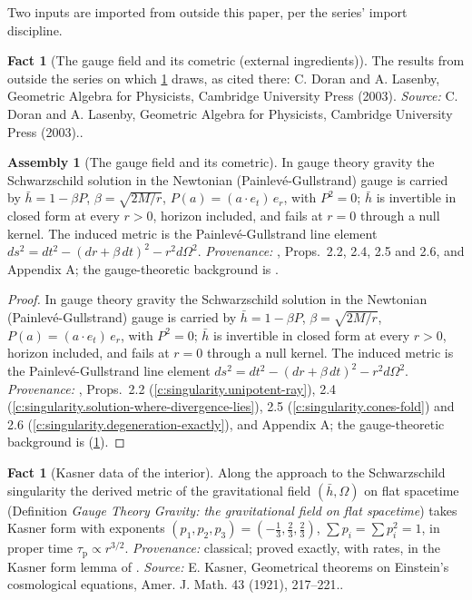 \documentclass[11pt]{article}
\theoremstyle{definition}
\newtheorem{fact}[theorem]{Fact}
\newtheorem{assembled}[theorem]{Assembly}
\theoremstyle{plain}
\newcommand{\changedmark}[2]{\marginpar{\raggedright\scriptsize\color{#1}#2}}
\providecommand{\hb}{}\renewcommand{\hb}{\bar{h}}
\begin{document}
Two inputs are imported from outside this paper, per the series' import discipline.

\begin{fact}[The gauge field and its cometric (external ingredients)]\label{c:sheaf.gauge-field-cometric-external}
The results from outside the series on which \ref{c:sheaf.gauge-field-cometric} draws, as cited there: C. Doran and A. Lasenby, Geometric Algebra for Physicists, Cambridge University Press (2003).
\emph{Source:} C. Doran and A. Lasenby, Geometric Algebra for Physicists, Cambridge University Press (2003)..
\end{fact}

\begin{assembled}[The gauge field and its cometric]\label{c:sheaf.gauge-field-cometric}
In gauge theory gravity the Schwarzschild solution in the Newtonian (Painlev\'e-Gullstrand) gauge is carried by $\hb = 1 - \beta P$, $\beta = \sqrt{2M/r}$, $P(a) = (a \cdot e_t)\,e_r$, with $P^2 = 0$; $\hb$ is invertible in closed form at every $r > 0$, horizon included, and fails at $r = 0$ through a null kernel. The induced metric is the Painlev\'e-Gullstrand line element $ds^2 = dt^2 - (dr + \beta\,dt)^2 - r^2 d\Omega^2$. \emph{Provenance:} \cite{ButlerT5}, Props.~2.2, 2.4, 2.5 and 2.6, and Appendix A; the gauge-theoretic background is \cite{DoranLasenby2003}.
\end{assembled}
\begin{proof}
In gauge theory gravity the Schwarzschild solution in the Newtonian (Painlev\'e-Gullstrand) gauge is carried by $\hb = 1 - \beta P$, $\beta = \sqrt{2M/r}$, $P(a) = (a \cdot e_t)\,e_r$, with $P^2 = 0$; $\hb$ is invertible in closed form at every $r > 0$, horizon included, and fails at $r = 0$ through a null kernel. The induced metric is the Painlev\'e-Gullstrand line element $ds^2 = dt^2 - (dr + \beta\,dt)^2 - r^2 d\Omega^2$. \emph{Provenance:} \cite{ButlerT5}, Props.~2.2 (\ref{c:singularity.unipotent-ray}), 2.4 (\ref{c:singularity.solution-where-divergence-lies}), 2.5 (\ref{c:singularity.cones-fold}) and 2.6 (\ref{c:singularity.degeneration-exactly}), and Appendix A; the gauge-theoretic background is \cite{DoranLasenby2003} (\ref{c:sheaf.gauge-field-cometric-external}).

\end{proof}

\begin{fact}[Kasner data of the interior]\label{c:sheaf.kasner-data-interior}
\changedmark{gray}{reworded}
Along the approach to the Schwarzschild singularity the derived metric of the gravitational field $(\hb, \Omega)$ on flat spacetime (Definition \emph{Gauge Theory Gravity: the gravitational field on flat spacetime}) takes Kasner form \cite{Kasner1921} with exponents $(p_1, p_2, p_3) = (-\tfrac13, \tfrac23, \tfrac23)$, $\sum p_i = \sum p_i^2 = 1$, in proper time $\tau_{\mathrm{p}} \propto r^{3/2}$. \emph{Provenance:} classical; proved exactly, with rates, in the Kasner form lemma of \cite{ButlerT6}.
\emph{Source:} E. Kasner, Geometrical theorems on Einstein's cosmological equations, Amer. J. Math. 43 (1921), 217--221..
\end{fact}
\end{document}
